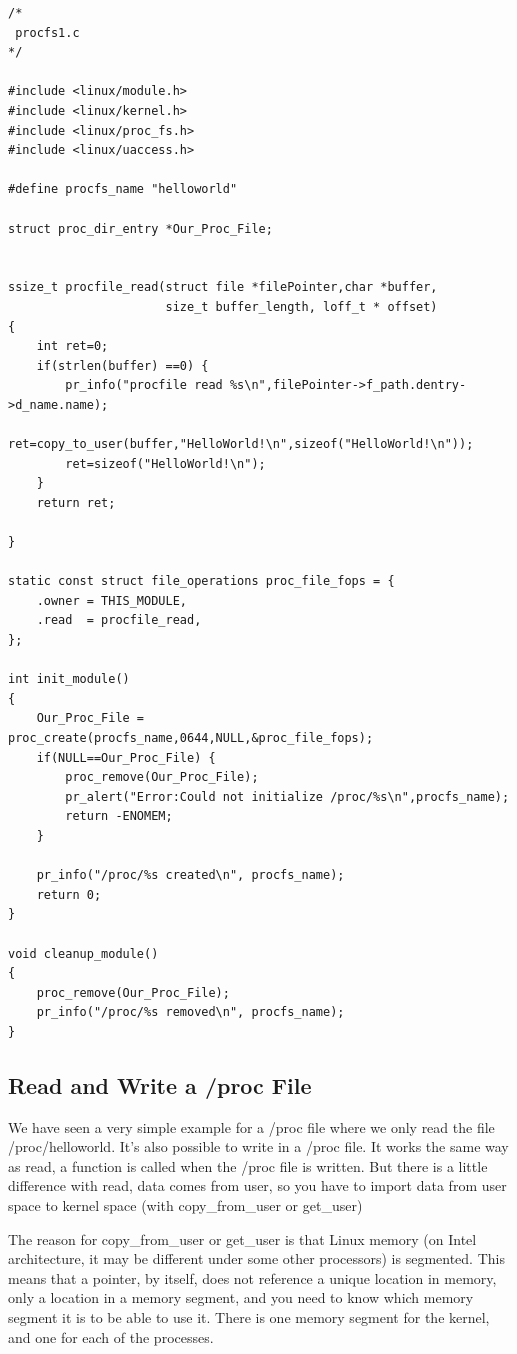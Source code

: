 \documentclass[11pt]{article}
\begin{document}
\begin{verbatim}
/*
 procfs1.c
*/

#include <linux/module.h>
#include <linux/kernel.h>
#include <linux/proc_fs.h>
#include <linux/uaccess.h>

#define procfs_name "helloworld"

struct proc_dir_entry *Our_Proc_File;


ssize_t procfile_read(struct file *filePointer,char *buffer,
                      size_t buffer_length, loff_t * offset)
{
    int ret=0;
    if(strlen(buffer) ==0) {
        pr_info("procfile read %s\n",filePointer->f_path.dentry->d_name.name);
        ret=copy_to_user(buffer,"HelloWorld!\n",sizeof("HelloWorld!\n"));
        ret=sizeof("HelloWorld!\n");
    }
    return ret;

}

static const struct file_operations proc_file_fops = {
    .owner = THIS_MODULE,
    .read  = procfile_read,
};

int init_module()
{
    Our_Proc_File = proc_create(procfs_name,0644,NULL,&proc_file_fops);
    if(NULL==Our_Proc_File) {
        proc_remove(Our_Proc_File);
        pr_alert("Error:Could not initialize /proc/%s\n",procfs_name);
        return -ENOMEM;
    }

    pr_info("/proc/%s created\n", procfs_name);
    return 0;
}

void cleanup_module()
{
    proc_remove(Our_Proc_File);
    pr_info("/proc/%s removed\n", procfs_name);
}
\end{verbatim}

\subsection*{Read and Write a /proc File}
\label{sec-7-1}
We have seen a very simple example for a /proc file where we only read the file /proc/helloworld. It's also possible to write in a /proc file. It works the same way as read, a function is called when the /proc file is written. But there is a little difference with read, data comes from user, so you have to import data from user space to kernel space (with copy\_from\_user or get\_user)

The reason for copy\_from\_user or get\_user is that Linux memory (on Intel architecture, it may be different under some other processors) is segmented. This means that a pointer, by itself, does not reference a unique location in memory, only a location in a memory segment, and you need to know which memory segment it is to be able to use it. There is one memory segment for the kernel, and one for each of the processes.
\end{document}
